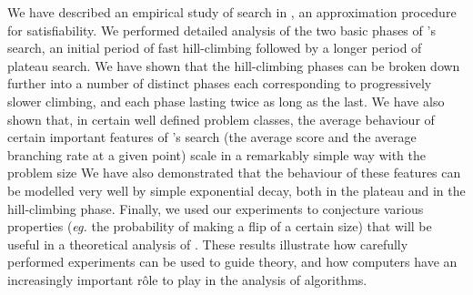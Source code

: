 We have described an empirical study of search in 
\GSAT, an approximation procedure for satisfiability.
We performed detailed analysis of the two basic phases of 
\GSAT's search, an initial period of fast hill-climbing
followed by a longer period of plateau search.
We have shown that the hill-climbing phases can
be broken down further into a number of 
distinct phases each corresponding to progressively
slower climbing, and each phase lasting twice as long as the last.
We have also shown that, in certain well defined problem classes,
the average behaviour of certain important features of
\GSAT's search (the average score and the average 
branching rate at a given point)
scale in a remarkably simple way with the problem size
We have also demonstrated that the behaviour of these features 
can be modelled very well by simple exponential decay, 
both in the plateau and in the hill-climbing phase.
Finally, we used our experiments to conjecture various properties
({\it eg.} the probability of making a flip of a certain size) that 
will be useful in a theoretical analysis of \GSAT.
These results illustrate how carefully performed experiments
can be used to guide theory, and
how computers have an increasingly
important r\^{o}le to play in the analysis of algorithms.



\vskip 0.2in

